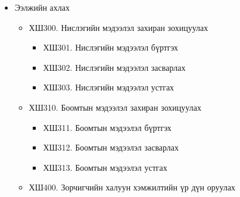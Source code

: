 \begin{itemize}
	\item Ээлжийн ахлах
	\begin{itemize}
	    \item ХШ300. Нислэгийн мэдээлэл захиран зохицуулах 
            \begin{itemize}
                \item ХШ301. Нислэгийн мэдээлэл бүртгэх 
                \item ХШ302. Нислэгийн мэдээлэл засварлах 
                \item ХШ303. Нислэгийн мэдээлэл устгах 
            \end{itemize}
            \item ХШ310. Боомтын мэдээлэл захиран зохицуулах 
            \begin{itemize}
                \item ХШ311. Боомтын мэдээлэл бүртгэх 
                \item ХШ312. Боомтын мэдээлэл засварлах 
                \item ХШ313. Боомтын мэдээлэл устгах 
            \end{itemize}
	\end{itemize}

        \begin{itemize}
            \item ХШ400. Зорчигчийн халуун хэмжилтийн үр дүн оруулах
        \end{itemize}
\end{itemize}

